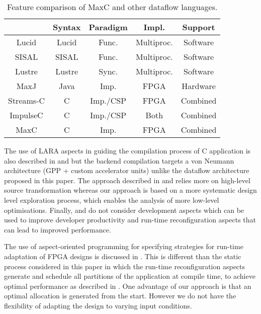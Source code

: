 \begin{table}[!h]
  \renewcommand{\arraystretch}{1.2}
  \centering
  \caption{Feature comparison of MaxC and other dataflow languages.}
  \label{table:feature-comparison}
  \begin{tabular}{ c |  c |  c |  c |  c }
    \hline
    \         & \bf{Syntax} & \bf{Paradigm} & \bf{Impl.} & \bf{Support} \\
    \hline \hline
    Lucid     & Lucid       & Func.         & Multiproc. & Software     \\
    SISAL     & SISAL       & Func.         & Multiproc. & Software     \\
    Lustre    & Lustre      & Sync.         & Multiproc. & Software     \\
    MaxJ      & Java        & Imp.          & FPGA       & Hardware     \\
    Streams-C & C           & Imp./CSP      & FPGA       & Combined     \\
    ImpulseC  & C           & Imp./CSP      & Both       & Combined     \\
    MaxC      & C           & Imp.          & FPGA       & Combined     \\
  \end{tabular}
  \vspace{-3mm}
\end{table}

The use of LARA aspects in guiding the compilation process of C
application is also described in
\cite{Cardoso:Teixeira:Alves:Nobre:Diniz:Cutinho:Luk:2012} and
\cite{cardoso2011new} but the backend compilation targets a von
Neumann architecture (GPP + custom accelerator units) unlike the
dataflow architecture proposed in this paper. The approach described
in \cite{Cardoso:Teixeira:Alves:Nobre:Diniz:Cutinho:Luk:2012} and
\cite{cardoso2011new} relies more on high-level source transformation
whereas our approach is based on a more systematic design level
exploration process, which enables the analysis of more low-level
optimisations. Finally,
\cite{Cardoso:Teixeira:Alves:Nobre:Diniz:Cutinho:Luk:2012} and
\cite{cardoso2011new} do not consider development aspects which can be
used to improve developer productivity and run-time reconfiguration
aspects that can lead to improved performance.

The use of aspect-oriented programming for specifying strategies for
run-time adaptation of FPGA designs is discussed in
\cite{6322875}. This is different than the static process considered
in this paper in which the run-time reconfiguration aspects generate
and schedule all partitions of the application at compile time, to
achieve optimal performance as described in
\cite{Xinyu:Qiwei:Luk:Qiang:Pell:2012}. One advantage of our approach
is that an optimal allocation is generated from the start. However we
do not have the flexibility of adapting the design to varying input
conditions.
